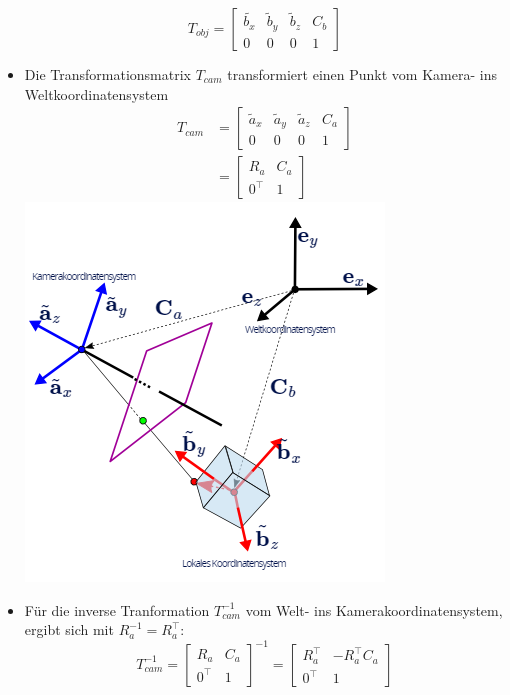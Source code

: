 \documentclass{scrartcl}
\begin{document}
\begin{itemize}
	\begin{equation}
		T_{obj} = \begin{bmatrix}
		\widetilde{b_x} & \widetilde{b}_y & \widetilde{b}_z & C_b \\
		0 & 0 & 0 & 1 
		\end{bmatrix}
	\end{equation}
	\item Die Transformationsmatrix $T_{cam}$ transformiert einen Punkt vom Kamera- ins Weltkoordinatensystem
	\begin{equation}
		\begin{split}
			T_{cam} &= \begin{bmatrix}
			\widetilde{a}_x & \widetilde{a}_y & \widetilde{a}_z & C_a \\
			0 & 0 & 0 & 1
			\end{bmatrix} \\
			&= \begin{bmatrix}
			R_a & C_a \\
			0^\top & 1
			\end{bmatrix}
		\end{split}
	\end{equation}
	\includegraphics[scale=0.5]{figures/local2cam2.png}
	\item Für die inverse Tranformation $T_{cam}^{-1}$ vom Welt- ins Kamerakoordinatensystem, ergibt sich mit $R_a^{-1} = R_a^\top$:
	\begin{equation}
		T_{cam}^{-1} = \begin{bmatrix}
		R_a & C_a \\
		0^\top & 1
		\end{bmatrix}^{-1} = \begin{bmatrix}
		R_a^\top & -R_a^\top C_a \\
		0^\top & 1
		\end{bmatrix}
	\end{equation}
\end{itemize}
\end{document}
